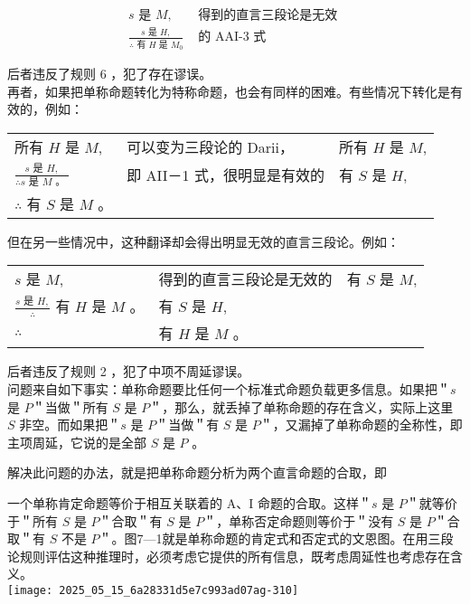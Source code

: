$$
\begin{array}{ll}
s \text { 是 } M, & \text { 得到的直言三段论是无效 } \\
\frac{s \text { 是 } H,}{\therefore \text { 有 } H \text { 是 } M_{0}} & \text { 的 AAI-3 式 }
\end{array}
$$

后者违反了规则 6 ，犯了存在谬误。\\
再者，如果把单称命题转化为特称命题，也会有同样的困难。有些情况下转化是有效的，例如：

\begin{center}
\begin{tabular}{lll}
所有 $H$ 是 $M$, & 可以变为三段论的 Darii， & 所有 $H$ 是 $M$, \\
$\frac{s \text { 是 } H,}{\therefore s \text { 是 } M \text { 。 }}$ & 即 AII－1 式，很明显是有效的 & 有 $S$ 是 $H$, \\
$\therefore$ 有 $S$ 是 $M$ 。 &  &  \\
\end{tabular}
\end{center}

但在另一些情况中，这种翻译却会得出明显无效的直言三段论。例如：

\begin{center}
\begin{tabular}{lll}
$s$ 是 $M$, & 得到的直言三段论是无效的 & 有 $S$ 是 $M$, \\
$\frac{s \text { 是 } H,}{\therefore}$ 有 $H$ 是 $M$ 。 & 有 $S$ 是 $H$, &  \\
$\therefore$ & 有 $H$ 是 $M$ 。 &  \\
\end{tabular}
\end{center}

后者违反了规则 2 ，犯了中项不周延谬误。\\
问题来自如下事实：单称命题要比任何一个标准式命题负载更多信息。如果把＂$s$ 是 $P$＂当做＂所有 $S$ 是 $P$＂，那么，就丢掉了单称命题的存在含义，实际上这里 $S$ 非空。而如果把＂$s$ 是 $P$＂当做＂有 $S$ 是 $P$＂，又漏掉了单称命题的全称性，即主项周延，它说的是全部 $S$ 是 $P$ 。

解决此问题的办法，就是把单称命题分析为两个直言命题的合取，即

一个单称肯定命题等价于相互关联着的 A、I 命题的合取。这样＂$s$ 是 $P$＂就等价于＂所有 $S$ 是 $P$＂合取＂有 $S$ 是 $P$＂，单称否定命题则等价于＂没有 $S$ 是 $P$＂合取＂有 $S$ 不是 $P$＂。图7—1就是单称命题的肯定式和否定式的文恩图。在用三段论规则评估这种推理时，必须考虑它提供的所有信息，既考虑周延性也考虑存在含义。\\
\texttt{[image: 2025\_05\_15\_6a28331d5e7c993ad07ag-310]}

